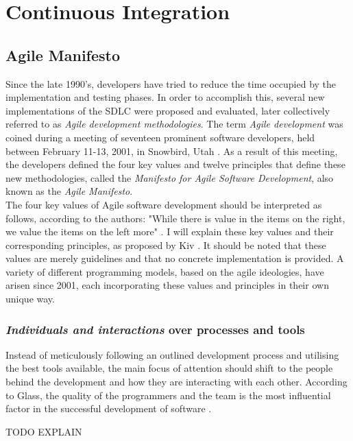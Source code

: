 \section{Continuous Integration}
\subsection{Agile Manifesto}
Since the late 1990's, developers have tried to reduce the time occupied by the implementation and testing phases. In order to accomplish this, several new implementations of the SDLC were proposed and evaluated, later collectively referred to as \emph{Agile development methodologies}. The term \emph{Agile development} was coined during a meeting of seventeen prominent software developers, held between February 11-13, 2001, in Snowbird, Utah \cite{jimhighsmith2001}. As a result of this meeting, the developers defined the four key values and twelve principles that define these new methodologies, called the \emph{Manifesto for Agile Software Development}, also known as the \emph{Agile Manifesto}.\\

\noindent The four key values of Agile software development should be interpreted as follows, according to the authors: "While there is value in the items on the right, we value the items on the left more" \cite{beck2001agile}. I will explain these key values and their corresponding principles, as proposed by Kiv \cite[p.~12]{10.1007/978-3-030-03673-7_2}. It should be noted that these values are merely guidelines and that no concrete implementation is provided. A variety of different programming models, based on the agile ideologies, have arisen since 2001, each incorporating these values and principles in their own unique way.

\subsubsection{\emph{Individuals and interactions} over processes and tools}
Instead of meticulously following an outlined development process and utilising the best tools available, the main focus of attention should shift to the people behind the development and how they are interacting with each other. According to Glass, the quality of the programmers and the team is the most influential factor in the successful development of software \cite{glass2001agile}. 

TODO EXPLAIN

